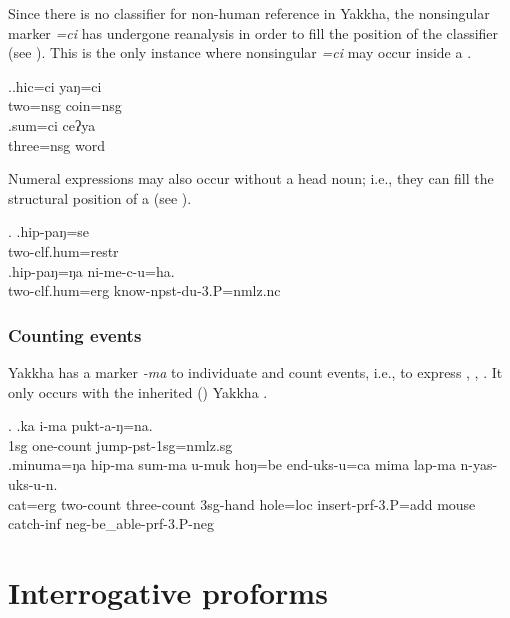 Since there is no classifier for non-human reference in Yakkha, the nonsingular marker \emph{=ci} has undergone reanalysis in order to fill the  position of the classifier (see \Next). This is the only instance where nonsingular \emph{=ci} may occur inside a . 

\ex.\ag.hic=ci yaŋ=ci\\
two{\sc =nsg} coin{\sc =nsg}\\
  
\bg.sum=ci ceʔya\\
three{\sc =nsg} word\\
  

Numeral expressions may also occur without a head noun; i.e., they can fill the structural position of a  (see \Next).

\ex. \ag.hip-paŋ=se\\
two{\sc -clf.hum=restr}\\
 
\bg.hip-paŋ=ŋa       ni-me-c-u=ha.\\
two{\sc -clf.hum=erg} know{\sc -npst-du-3.P=nmlz.nc}\\
 
			
\subsubsection{Counting events}

Yakkha has a marker \emph{-ma} to individuate and count events, i.e., to express , , . It only occurs with the inherited () Yakkha .

\ex. \ag.ka i-ma pukt-a-ŋ=na.\\
{\sc 1sg} one{\sc -count} jump{\sc -pst-1sg=nmlz.sg}\\
\bg.minuma=ŋa   hip-ma     sum-ma       u-muk       hoŋ=be    end-uks-u=ca mima  lap-ma      n-yas-uks-u-n.\\
cat{\sc =erg} two{\sc -count} three{\sc -count} {\sc 3sg-}hand hole{\sc =loc} insert{\sc -prf-3.P=add} mouse catch{\sc -inf} {\sc neg-}be\_able{\sc -prf-3.P-neg}\\
 

\section{Interrogative proforms}\label{interr}

